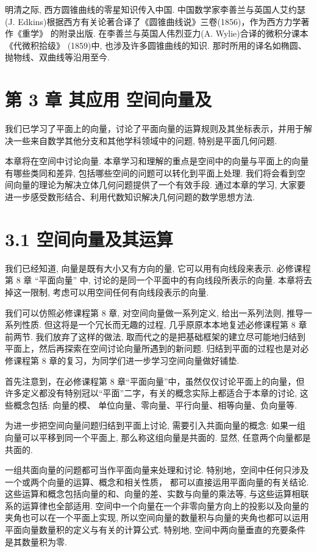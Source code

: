 \documentclass[10pt]{article}
\begin{document}
明清之际, 西方圆锥曲线的零星知识传入中国. 中国数学家李善兰与英国人艾约瑟 (J. Edkins)根据西方有关论著合译了《圆锥曲线说》三卷(1856)，作为西方力学著作《重学》 的附录出版. 在李善兰与英国人伟烈亚力(A. Wylie)合译的微积分课本《代微积拾级》 (1859)中, 也涉及许多圆锥曲线的知识. 那时所用的译名如椭圆、抛物线、双曲线等沿用至今.

\section*{第 3 章 其应用 空间向量及}

我们已学习了平面上的向量，讨论了平面向量的运算规则及其坐标表示，并用于解决一些来自数学其他分支和其他学科领域中的问题, 特别是平面几何问题.

本章将在空间中讨论向量. 本章学习和理解的重点是空间中的向量与平面上的向量有哪些类同和差异, 包括哪些空间的问题可以转化到平面上处理. 我们将会看到空间向量的理论为解决立体几何问题提供了一个有效手段. 通过本章的学习, 大家要进一步感受数形结合、利用代数知识解决几何问题的数学思想方法.

\section*{3.1 空间向量及其运算}

我们已经知道, 向量是既有大小又有方向的量, 它可以用有向线段来表示. 必修课程第 8 章 “平面向量” 中, 讨论的是同一个平面中的有向线段所表示的向量. 本章将去掉这一限制, 考虑可以用空间任何有向线段表示的向量.

我们可以仿照必修课程第 8 章, 对空间向量做一系列定义, 给出一系列法则, 推导一系列性质. 但这将是一个冗长而无趣的过程, 几乎原原本本地复述必修课程第 8 章前两节. 我们放弃了这样的做法, 取而代之的是把基础框架的建立尽可能地归结到平面上，然后再探索在空间讨论向量所遇到的新问题. 归结到平面的过程也是对必修课程第 8 章的复习，为同学们进一步学习空间向量做好铺垫.

首先注意到，在必修课程第 8 章“平面向量”中，虽然仅仅讨论平面上的向量，但许多定义都没有特别冠以“平面”二字，有关的概念实际上都适合于本章的讨论, 这些概念包括: 向量的模、 单位向量、零向量、平行向量、相等向量、负向量等.

为进一步把空间向量问题归结到平面上讨论, 需要引入共面向量的概念: 如果一组向量可以平移到同一个平面上, 那么称这组向量是共面的. 显然, 任意两个向量都是共面的.

一组共面向量的问题都可当作平面向量来处理和讨论. 特别地，空间中任何只涉及一个或两个向量的运算、概念和相关性质， 都可以直接运用平面向量的有关结论. 这些运算和概念包括向量的和、向量的差、实数与向量的乘法等, 与这些运算相联系的运算律也全部适用. 空间中一个向量在一个非零向量方向上的投影以及向量的夹角也可以在一个平面上实现, 所以空间向量的数量积与向量的夹角也都可以运用平面向量数量积的定义与有关的计算公式. 特别地, 空间中两向量垂直的充要条件是其数量积为零.
\end{document}
